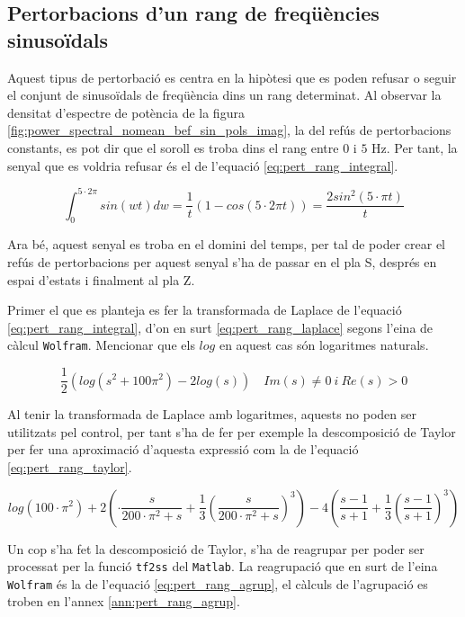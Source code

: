 \documentclass[12pt,a4paper,final,twoside,openright]{report}
\begin{document}
\newpage
\subsection{Pertorbacions d'un rang de freqüències sinusoïdals}
\label{sec:pert_rang_sin}

Aquest tipus de pertorbació es centra en la hipòtesi que es poden refusar o seguir el conjunt de sinusoïdals de freqüència dins un rang determinat. Al observar la densitat d'espectre de potència de la figura \ref{fig:power_spectral_nomean_bef_sin_pols_imag}, la del refús de pertorbacions constants, es pot dir que el soroll es troba dins el rang entre $0$ i $5$ Hz. Per tant, la senyal que es voldria refusar és el de l'equació \eqref{eq:pert_rang_integral}.

\begin{equation}\label{eq:pert_rang_integral}
\int_{0}^{5\cdot 2\pi} sin(wt) d w = \frac{1}{t}(1-cos(5\cdot 2\pi t)) = \frac{2 sin^2(5\cdot \pi t)}{t}
\end{equation}

Ara bé, aquest senyal es troba en el domini del temps, per tal de poder crear el refús de pertorbacions per aquest senyal s'ha de passar en el pla S, després en espai d'estats i finalment al pla Z. 

Primer el que es planteja es fer la transformada de Laplace de l'equació \eqref{eq:pert_rang_integral}, d'on en surt \ref{eq:pert_rang_laplace} segons l'eina de càlcul \texttt{Wolfram}. Mencionar que els $log$ en aquest cas són logaritmes naturals.

\begin{equation}\label{eq:pert_rang_laplace}
\frac{1}{2}(log(s^2+100\pi^2)-2log(s)) \quad Im(s) \neq 0 ~ i ~ Re(s) > 0
\end{equation}

Al tenir la transformada de Laplace amb logaritmes, aquests no poden ser utilitzats pel control, per tant s'ha de fer per exemple la descomposició de Taylor per fer una aproximació d'aquesta expressió com la de l'equació \eqref{eq:pert_rang_taylor}.

\begin{equation}\label{eq:pert_rang_taylor}
log\left(100\cdot \pi^2\right)+2\left(\cdot \frac{s}{200\cdot \pi^2+s} +\frac{1}{3} \left(\frac{s}{200\cdot \pi^2+s}\right)^3\right)-4 \left(\frac{s-1}{s+1}+\frac{1}{3} \left(\frac{s-1}{s+1}\right)^3\right)
\end{equation}

Un cop s'ha fet la descomposició de Taylor, s'ha de reagrupar per poder ser processat per la funció \texttt{tf2ss} del \texttt{Matlab}. La reagrupació que en surt de l'eina \texttt{Wolfram} és la de l'equació \eqref{eq:pert_rang_agrup}, el càlculs de l'agrupació es troben en l'annex \ref{ann:pert_rang_agrup}.
\end{document}
